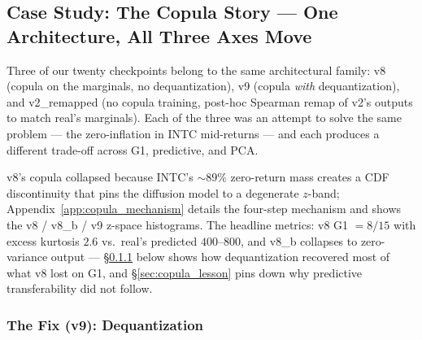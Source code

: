 \documentclass[journal]{IEEEtran}
\theoremstyle{definition}   %
\begin{document}
\subsection{Case Study: The Copula Story --- One Architecture, All Three Axes Move}
\label{sec:copula_story}
%

Three of our twenty checkpoints belong to the same architectural
family: v8 (copula on the marginals, no dequantization), v9 (copula
\emph{with} dequantization), and v2\_remapped (no copula training,
post-hoc Spearman remap of v2's outputs to match real's marginals).
Each of the three was an attempt to solve the same problem --- the
zero-inflation in INTC mid-returns --- and each produces a different
trade-off across G1, predictive, and PCA.

v8's copula collapsed because INTC's $\sim 89\%$ zero-return mass
creates a CDF discontinuity that pins the diffusion model to a
degenerate $z$-band; Appendix~\ref{app:copula_mechanism} details the
four-step mechanism and shows the v8 / v8\_b / v9 z-space histograms.
The headline metrics: v8 G1 $= 8/15$ with excess kurtosis $2.6$ vs.\
real's predicted $400$--$800$, and v8\_b collapses to zero-variance
output --- \S\ref{sec:copula_fix} below shows how dequantization
recovered most of what v8 lost on G1, and \S\ref{sec:copula_lesson}
pins down why predictive transferability did not follow.

\subsubsection{The Fix (v9): Dequantization}
\label{sec:copula_fix}
\end{document}
